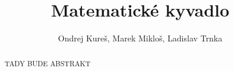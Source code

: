 \documentclass[reqno, a4paper]{amsart}
\title[Matematické kyvadlo]{Matematické kyvadlo}
\author{Ondrej Kureš, Marek Mikloš, Ladislav Trnka}
\numberwithin{equation}{section}
\begin{document}
\begin{abstract}
TADY BUDE ABSTRAKT
\end{abstract}

\maketitle

\tableofcontents




%
%
%

\end{document}
